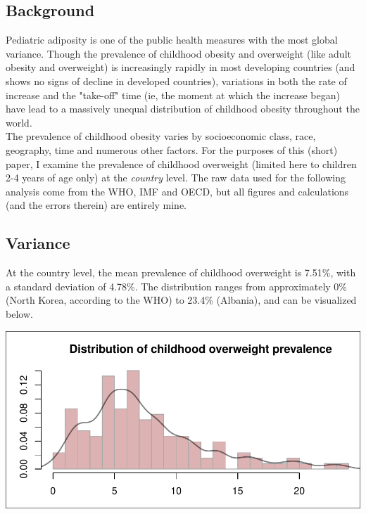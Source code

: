 \documentclass[11pt]{article}
\begin{document}
\begin{multicols}{2} 

\subsection*{Background}

Pediatric adiposity is one of the public health measures with the most global variance.  Though the prevalence of childhood obesity and overweight (like adult obesity and overweight) is increasingly rapidly in most developing countries (and shows no signs of decline in developed countries), variations in both the rate of increase and the "take-off" time (ie, the moment at which the increase began) have lead to a massively unequal distribution of childhood obesity throughout the world.  \\

The prevalence of childhood obesity varies by socioeconomic class, race, geography, time and numerous other factors.  For the purposes of this (short) paper, I examine the prevalence of childhood overweight (limited here to children 2-4 years of age only) at the \emph{country} level.  The raw data used for the following analysis come from the WHO, IMF and OECD, but all figures and calculations (and the errors therein) are entirely mine. \\

\subsection*{Variance}
At the country level, the mean prevalence of childhood overweight is 7.51\%, with a standard deviation of 4.78\%.  The distribution ranges from approximately 0\% (North Korea, according to the WHO) to 23.4\% (Albania), and can be visualized below.\\

\begin{center}
\includegraphics{global_variance-003}
\end{center}


\end{multicols}
\end{document}
